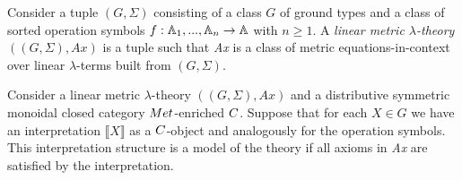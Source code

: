 \documentclass[a4paper,UKenglish,cleveref, autoref, thm-restate]{lipics-v2021}
\begin{document}
%

\begin{definition}
Consider a tuple $(G,\Sigma)$ consisting of a class $G$ of ground
 types and a class of sorted operation symbols $f : \mathbb{A}_1,...,\mathbb{A}_n \rightarrow \mathbb{A}$ with $n \geq 1$. A \emph{linear metric $\lambda$-theory} $((G,\Sigma),\textit{Ax})$ is a tuple such that \textit{Ax} is a class of metric equations-in-context over linear $\lambda$-terms built from $(G,\Sigma)$.
\end{definition}

\begin{definition}
  Consider a linear metric $\lambda$-theory $((G,\Sigma),\textit{Ax})$ and a distributive symmetric monoidal closed category $\catMet$-enriched $\catC$. Suppose that for each $X \in G$ we have an interpretation $\llbracket X \rrbracket$ as a $\catC$-object and analogously for the operation symbols. This interpretation structure is a model of the theory if all axioms in \textit{Ax} are satisfied by the interpretation.
\end{definition}
\end{document}
